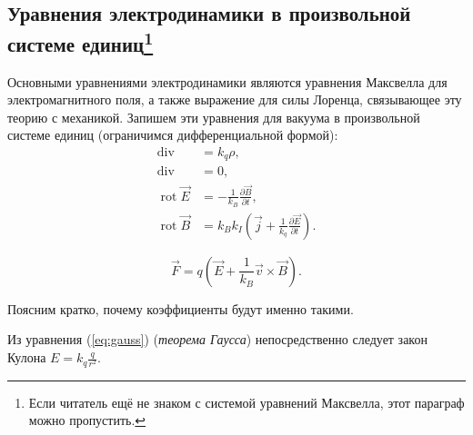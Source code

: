 \subsection*{Уравнения электродинамики в произвольной системе единиц\protect\footnote{Если читатель ещё не знаком с системой уравнений Максвелла, этот параграф
можно пропустить.}}

Основными уравнениями электродинамики являются уравнения Максвелла
для электромагнитного поля, а также выражение для силы Лоренца, связывающее
эту теорию с механикой. Запишем эти уравнения для вакуума в произвольной
системе единиц (ограничимся дифференциальной формой):
\begin{align}
\mathop{\mathrm{div}\vec{E}} & =k_{q}\rho,\label{eq:gauss}\\
\mathop{\mathrm{div}\vec{B}} & =0,\\
\mathop{\mathrm{rot}}\vec{E} & =-\frac{1}{k_{B}}\frac{\partial\vec{B}}{\partial t},\label{eq:faradey}\\
\mathop{\mathrm{rot}}\vec{B} & =k_{B}k_{I}\left(\vec{j}+\frac{1}{k_{q}}\frac{\partial\vec{E}}{\partial t}\right).\label{eq:ampere-dif}
\end{align}
\begin{comment}
\begin{align*}
\oint_{S}\vec{E}\cdot d\vec{S} & =k_{q}q, & \mathop{\mathrm{div}\vec{E}} & =k_{q}\rho,\\
\oint_{S}\vec{B}\cdot d\vec{S} & =0, & \mathop{\mathrm{div}\vec{B}} & =0,\\
\oint_{\Gamma}\vec{E}\cdot d\vec{l} & =-\frac{\partial}{\partial t}\int_{S}\frac{\vec{B}}{k_{B}}\cdot d\vec{S}, & \mathop{\mathrm{rot}}\vec{E} & =-\frac{1}{k_{B}}\frac{\partial\vec{B}}{\partial t},\\
\oint_{\Gamma}\frac{\vec{B}}{k_{B}}\cdot d\vec{l} & =k_{I}\left(I+\frac{\partial}{\partial t}\int_{S}\frac{\vec{E}}{k_{q}}\cdot d\vec{S}\right), & \mathop{\mathrm{rot}}\vec{B} & =k_{B}k_{I}\left(\vec{j}+\frac{1}{k_{q}}\frac{\partial\vec{E}}{\partial t}\right).
\end{align*}
\end{comment}
\begin{equation}
\vec{F}=q\left(\vec{E}+\frac{1}{k_{B}}\vec{v}\times\vec{B}\right).\label{eq:lorentz}
\end{equation}

Поясним кратко, почему коэффициенты будут именно такими. 

Из уравнения (\ref{eq:gauss}) (\emph{теорема Гаусса}) непосредственно
следует закон Кулона $E=k_{q}\frac{q}{r^{2}}$. 

